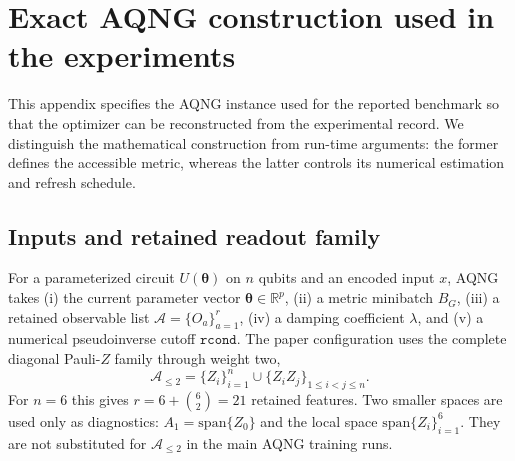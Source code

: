 \appendix
\section{Exact AQNG construction used in the experiments}
\label{app:aqng}

This appendix specifies the AQNG instance used for the reported benchmark so that the optimizer can be reconstructed from the experimental record.  We distinguish the mathematical construction from run-time arguments: the former defines the accessible metric, whereas the latter controls its numerical estimation and refresh schedule.

\subsection{Inputs and retained readout family}
For a parameterized circuit $U(\bm\theta)$ on $n$ qubits and an encoded input $x$, AQNG takes (i) the current parameter vector $\bm\theta\in\mathbb R^p$, (ii) a metric minibatch $B_G$, (iii) a retained observable list $\mathcal A=\{O_a\}_{a=1}^{r}$, (iv) a damping coefficient $\lambda$, and (v) a numerical pseudoinverse cutoff $\texttt{rcond}$.  The paper configuration uses the complete diagonal Pauli-$Z$ family through weight two,
\begin{equation}
 \mathcal A_{\le2}=\{Z_i\}_{i=1}^{n}\cup\{Z_iZ_j\}_{1\le i<j\le n}.
\end{equation}
For $n=6$ this gives $r=6+\binom{6}{2}=21$ retained features.  Two smaller spaces are used only as diagnostics: $A_1=\mathrm{span}\{Z_0\}$ and the local space $\mathrm{span}\{Z_i\}_{i=1}^{6}$.  They are not substituted for $\mathcal A_{\le2}$ in the main AQNG training runs.

